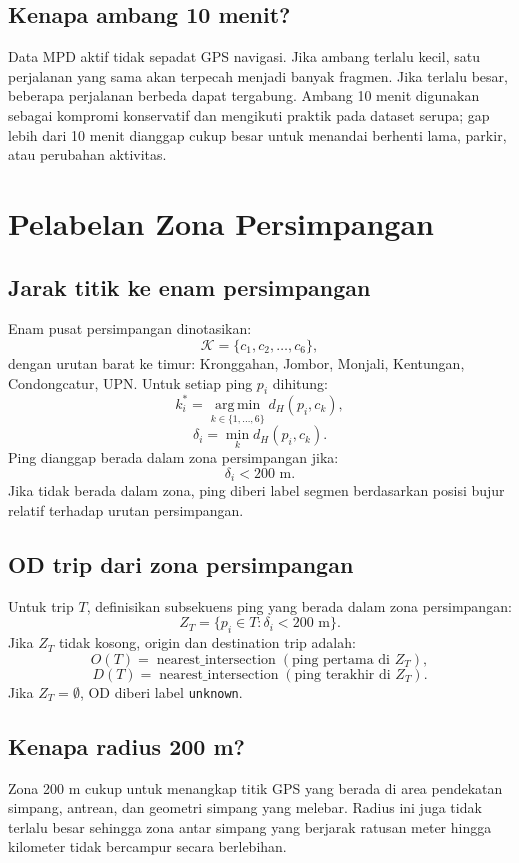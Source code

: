 \documentclass[11pt,a4paper]{article}
\newcommand{\argmin}{\operatorname*{arg\,min}}
\begin{document}
\subsection{Kenapa ambang 10 menit?}
Data MPD aktif tidak sepadat GPS navigasi. Jika ambang terlalu kecil, satu perjalanan yang sama akan terpecah menjadi banyak fragmen. Jika terlalu besar, beberapa perjalanan berbeda dapat tergabung. Ambang 10 menit digunakan sebagai kompromi konservatif dan mengikuti praktik pada dataset serupa; gap lebih dari 10 menit dianggap cukup besar untuk menandai berhenti lama, parkir, atau perubahan aktivitas.

\section{Pelabelan Zona Persimpangan}
\subsection{Jarak titik ke enam persimpangan}
Enam pusat persimpangan dinotasikan:
\[
\mathcal{K}=\{c_1,c_2,\ldots,c_6\},
\]
dengan urutan barat ke timur: Kronggahan, Jombor, Monjali, Kentungan, Condongcatur, UPN. Untuk setiap ping $p_i$ dihitung:
\[
k_i^*=\argmin_{k\in\{1,\ldots,6\}} d_H(p_i,c_k),
\]
\[
\delta_i=\min_k d_H(p_i,c_k).
\]
Ping dianggap berada dalam zona persimpangan jika:
\[
\delta_i<200\text{ m}.
\]
Jika tidak berada dalam zona, ping diberi label segmen berdasarkan posisi bujur relatif terhadap urutan persimpangan.

\subsection{OD trip dari zona persimpangan}
Untuk trip $T$, definisikan subsekuens ping yang berada dalam zona persimpangan:
\[
Z_T=\{p_i\in T: \delta_i<200\text{ m}\}.
\]
Jika $Z_T$ tidak kosong, origin dan destination trip adalah:
\[
O(T)=\operatorname{nearest\_intersection}(\text{ping pertama di }Z_T),
\]
\[
D(T)=\operatorname{nearest\_intersection}(\text{ping terakhir di }Z_T).
\]
Jika $Z_T=\emptyset$, OD diberi label \texttt{unknown}.

\subsection{Kenapa radius 200 m?}
Zona 200 m cukup untuk menangkap titik GPS yang berada di area pendekatan simpang, antrean, dan geometri simpang yang melebar. Radius ini juga tidak terlalu besar sehingga zona antar simpang yang berjarak ratusan meter hingga kilometer tidak bercampur secara berlebihan.
\end{document}
